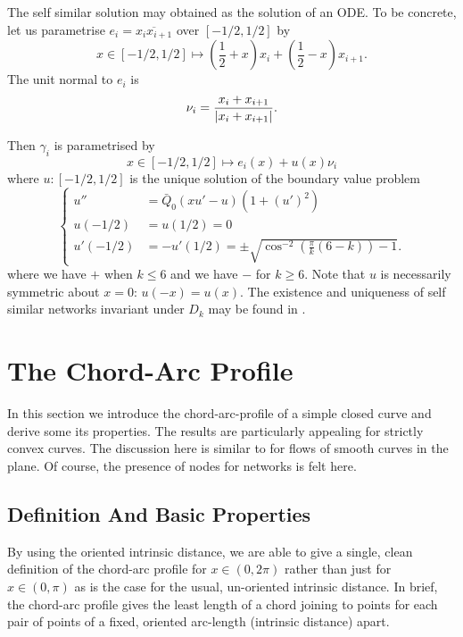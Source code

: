 \documentclass[12pt]{amsart}
\begin{document}
The self similar solution may obtained as the solution of an ODE. To be concrete, let us parametrise \(e_i = \overline{x_i x_{i+1}}\) over \([-1/2, 1/2]\) by
\[
x \in [-1/2, 1/2] \mapsto \left(\frac{1}{2} + x\right) x_i + \left(\frac{1}{2} - x\right) x_{i+1}.
\]
The unit normal to \(e_i\) is
\[
\nu_i = \frac{x_i + x_{i+1}}{\left|x_i + x_{i+1}\right|}.
\]

Then \(\gamma_i\) is parametrised by
\[
x \in [-1/2, 1/2] \mapsto e_i(x) + u(x) \nu_i
\]
where \(u : [-1/2, 1/2]\) is the unique solution of the boundary value problem
\begin{equation}
\label{eq:self_similar_graph}
\begin{cases}
u'' &= \bar{Q}_0 (xu' - u)(1 + (u')^2) \\
u(-1/2) &= u(1/2) = 0 \\
u'(-1/2) &= -u'(1/2) = \pm \sqrt{\cos^{-2} \left(\frac{\pi}{k}(6 - k)\right) - 1}.
\end{cases}
\end{equation}
where we have \(+\) when \(k \leq 6\) and we have \(-\) for \(k \geq 6\). Note that \(u\) is necessarily symmetric about \(x = 0\): \(u(-x) = u(x)\). The existence and uniqueness of self similar networks invariant under \(D_k\) may be found in \cite{MR2340176}.

\section{The Chord-Arc Profile}
\label{sec:orgheadline10}

In this section we introduce the chord-arc-profile of a simple closed curve and derive some its properties. The results are particularly appealing for strictly convex curves. The discussion here is similar to \cite{alpha_csf_dist_comp} for flows of smooth curves in the plane. Of course, the presence of nodes for networks is felt here.

\subsection{Definition And Basic Properties}
\label{sec:orgheadline7}

By using the oriented intrinsic distance, we are able to give a single, clean definition of the chord-arc profile for \(x \in (0, 2\pi)\) rather than just for \(x \in (0, \pi)\) as is the case for the usual, un-oriented intrinsic distance. In brief, the chord-arc profile gives the least length of a chord joining to points for each pair of points of a fixed, oriented arc-length (intrinsic distance) apart.
\end{document}
